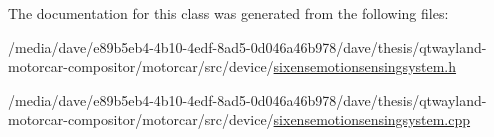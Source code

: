 The documentation for this class was generated from the following files\-:\begin{DoxyCompactItemize}
\item 
/media/dave/e89b5eb4-\/4b10-\/4edf-\/8ad5-\/0d046a46b978/dave/thesis/qtwayland-\/motorcar-\/compositor/motorcar/src/device/\hyperlink{sixensemotionsensingsystem_8h}{sixensemotionsensingsystem.\-h}\item 
/media/dave/e89b5eb4-\/4b10-\/4edf-\/8ad5-\/0d046a46b978/dave/thesis/qtwayland-\/motorcar-\/compositor/motorcar/src/device/\hyperlink{sixensemotionsensingsystem_8cpp}{sixensemotionsensingsystem.\-cpp}\end{DoxyCompactItemize}
